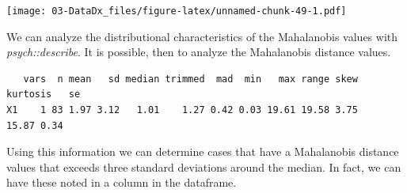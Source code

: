 \documentclass[
  11pt,
]{book}
\newenvironment{Shaded}{\begin{snugshade}}{\end{snugshade}}
\newcommand{\CommentTok}[1]{\textcolor[rgb]{0.37,0.37,0.37}{\textit{#1}}}
\newcommand{\ConstantTok}[1]{\textcolor[rgb]{0.37,0.37,0.37}{#1}}
\newcommand{\DecValTok}[1]{\textcolor[rgb]{0.06,0.06,0.06}{#1}}
\newcommand{\FunctionTok}[1]{\textcolor[rgb]{0.27,0.27,0.27}{\textbf{#1}}}
\newcommand{\NormalTok}[1]{#1}
\newcommand{\OtherTok}[1]{\textcolor[rgb]{0.37,0.37,0.37}{#1}}
\newcommand{\SpecialCharTok}[1]{\textcolor[rgb]{0.43,0.43,0.43}{\textbf{#1}}}
\newcommand{\StringTok}[1]{\textcolor[rgb]{0.5,0.5,0.5}{#1}}
\begin{document}
\begin{Shaded}
\end{Shaded}

\texttt{[image: 03-DataDx\_files/figure-latex/unnamed-chunk-49-1.pdf]}

We can analyze the distributional characteristics of the Mahalanobis values with \emph{psych::describe}. It is possible, then to analyze the Mahalanobis distance values.

\begin{Shaded}
\end{Shaded}

\begin{verbatim}
   vars  n mean   sd median trimmed  mad  min   max range skew kurtosis   se
X1    1 83 1.97 3.12   1.01    1.27 0.42 0.03 19.61 19.58 3.75    15.87 0.34
\end{verbatim}

Using this information we can determine cases that have a Mahalanobis distance values that exceeds three standard deviations around the median. In fact, we can have these noted in a column in the dataframe.

\begin{Shaded}
\end{Shaded}
\end{document}
